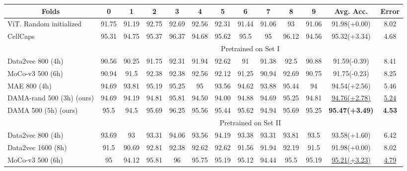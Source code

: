 \documentclass[10pt,twocolumn,letterpaper]{article}
\begin{document}
\begin{table*}[t]
\footnotesize
\centering
\begin{tabular}{lcccccccccccc}
\hline
\multicolumn{1}{c}{Folds}                 & 0     & 1     & 2     & 3     & 4     & 5     & 6     & 7     & 8     & 9     & Avg. Acc.  & Error            \\ \hline
ViT. Random   initialized        & 91.75 & 91.19 & 92.75 & 92.69 & 92.56 & 92.31 & 91.44 & 91.06 & 93    & 91.06 & 91.98(+0.00)  &  8.02      \\ 
CellCaps \cite{maric2021whole}        & 95.31 & 94.75 & 95.37 & 96.37 & 94.68 & 95.62 & 95.5 & 95 & 96.12    & 94.56 & 95.32(+3.34)  &  4.68      \\ \hline
                      & \multicolumn{12}{c}{Pretrained on  Set I}               \\ \hline
Data2vec \cite{data2vec} 800 (4h)        & 90.56 & 90.25 & 91.75 & 92.31 & 91.94 & 92.62 & 91    & 91.38 & 92.5  & 90.88 & 91.59(-0.39) &  8.41        \\
MoCo-v3 \cite{mocov3} 500 (6h)            & 90.94 & 91.5  & 92.38 & 92.38 & 92.56 & 92.12 & 91.25 & 90.94 & 92.69 & 90.75 & 91.75(-0.23) &  8.25      \\
MAE \cite{mae}  800 (4h)             & 94.69 & 93.81 & 95.19 & 95.25 & 95    & 93.56 & 94.62 & 93.88 & 95.44 & 94 & 94.54(+2.56)  & 5.46 \\
DAMA-rand 500 (3h) (ours)           & 94.69 & 94.19 & 94.81 & 95.81 & 94.50 & 94.00 & 94.88 & 94.69 & 95.25 & 94.81  & \underline{94.76(+2.78)} & \underline{5.24} \\
DAMA 500 (5h) (ours)           & 95.5 & 94.5 & 95.69 & 96.25 & 95.56 & 95.44 & 95.62 & 94.94 & 95.69 & 95.25 & \textbf{95.47(+3.49)} & \textbf{4.53} \\ \hline                      
                      & \multicolumn{12}{c}{Pretrained on Set II}                                                         \\ \hline
Data2vec \cite{data2vec} 800 (4h)    & 93.69 & 93    & 93.31 & 94.06 & 93.56 & 94.19 & 93.38 & 93.31 & 93.81 & 93.5  & 93.58(+1.60)  &   6.42    \\
Data2vec \cite{data2vec} 1600   (8h) & 91.5  & 90.69 & 92.81 & 92.38 & 92.62 & 92.62 & 91.56 & 91.94 & 92.19 & 91.5  & 91.98(+0.00)  &   8.02    \\
MoCo-v3 \cite{mocov3} 500 (6h)        & 95    & 94.12 & 95.81 & 96    & 95.75 & 95.19 & 95.12 & 94.44 & 95.5  & 95.19 & \underline{95.21(+3.23)} &  \underline{4.79} \\

\end{tabular}
\end{table*}
\end{document}
